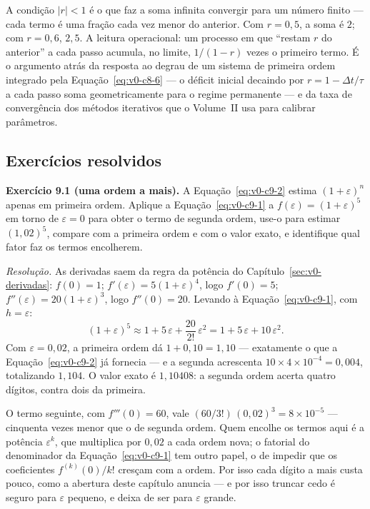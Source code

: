 \documentclass[12pt,a4paper]{article}
\numberwithin{equation}{section}
\numberwithin{table}{section}
\numberwithin{figure}{section}
\begin{document}
A condição $|r| < 1$ é o que faz a soma infinita convergir para um número
finito --- cada termo é uma fração cada vez menor do anterior. Com
$r = 0{,}5$, a soma é $2$; com $r = 0{,}6$, $2{,}5$. A leitura
operacional: um processo em que ``restam $r$ do anterior'' a cada passo
acumula, no limite, $1/(1-r)$ vezes o primeiro termo. É o argumento
atrás da resposta ao degrau de um sistema de primeira ordem integrado
pela Equação~\eqref{eq:v0-c8-6} --- o déficit inicial decaindo por
$r = 1 - \Delta t/\tau$ a cada passo soma geometricamente para o regime
permanente --- e da taxa de convergência dos métodos iterativos que o
Volume~II usa para calibrar parâmetros.

\subsection{Exercícios resolvidos}

\textbf{Exercício 9.1 (uma ordem a mais).} A Equação~\eqref{eq:v0-c9-2}
estima $(1+\varepsilon)^n$ apenas em primeira ordem. Aplique a
Equação~\eqref{eq:v0-c9-1} a $f(\varepsilon) = (1+\varepsilon)^5$ em
torno de $\varepsilon = 0$ para obter o termo de segunda ordem, use-o
para estimar $(1{,}02)^5$, compare com a primeira ordem e com o valor
exato, e identifique qual fator faz os termos encolherem.

\emph{Resolução.} As derivadas saem da regra da potência do
Capítulo~\ref{sec:v0-derivadas}: $f(0) = 1$;
$f'(\varepsilon) = 5(1+\varepsilon)^4$, logo $f'(0) = 5$;
$f''(\varepsilon) = 20(1+\varepsilon)^3$, logo $f''(0) = 20$. Levando à
Equação~\eqref{eq:v0-c9-1}, com $h = \varepsilon$:
$$(1+\varepsilon)^5 \approx 1 + 5\,\varepsilon
  + \frac{20}{2!}\,\varepsilon^2 = 1 + 5\,\varepsilon + 10\,\varepsilon^2.$$
Com $\varepsilon = 0{,}02$, a primeira ordem dá $1 + 0{,}10 = 1{,}10$ ---
exatamente o que a Equação~\eqref{eq:v0-c9-2} já fornecia --- e a segunda
acrescenta $10 \times 4\times 10^{-4} = 0{,}004$, totalizando
$1{,}104$. O valor exato é $1{,}10408$: a segunda ordem acerta quatro
dígitos, contra dois da primeira.

O termo seguinte, com $f'''(0) = 60$, vale
$(60/3!)\,(0{,}02)^3 = 8\times 10^{-5}$ --- cinquenta vezes menor que o
de segunda ordem. Quem encolhe os termos aqui é a potência
$\varepsilon^k$, que multiplica por $0{,}02$ a cada ordem nova; o
fatorial do denominador da Equação~\eqref{eq:v0-c9-1} tem outro papel,
o de impedir que os coeficientes $f^{(k)}(0)/k!$ cresçam com a ordem.
Por isso cada dígito a mais custa pouco, como a abertura deste capítulo
anuncia --- e por isso truncar cedo é seguro para $\varepsilon$ pequeno,
e deixa de ser para $\varepsilon$ grande.
\end{document}
